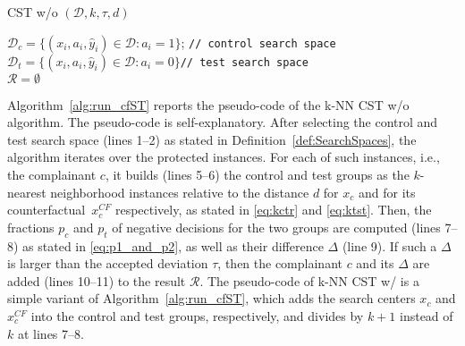 %
\begin{algorithm2e}[t]
\small %
    \caption{CST w/o $(\mathcal{D}, k, \tau, d)$}
    \label{alg:run_cfST}
	\BlankLine
	$\mathcal{D}_c=\{(x_i, a_i, \widehat{y}_i) \in \mathcal{D}: a_i=1\}$; \hfill\texttt{\scriptsize// control search space}\\
    $\mathcal{D}_t=\{(x_i, a_i, \widehat{y}_i) \in \mathcal{D}: a_i=0\}$\hfill\texttt{\scriptsize// test search space}\\
    $\mathcal{R} = \emptyset$\\
\end{algorithm2e}
%

Algorithm~\ref{alg:run_cfST} reports the pseudo-code of the k-NN CST w/o algorithm. The pseudo-code is self-explanatory. 
After selecting the control and test search space (lines 1--2) as stated in Definition~\ref{def:SearchSpaces}, the algorithm iterates over the protected instances. For each of such instances, i.e., the complainant $c$, it builds (lines 5--6) the control and test groups as the $k$-nearest neighborhood instances relative to the distance $d$ for $x_c$ and for its counterfactual~$x^{CF}_c$ respectively, as stated in \eqref{eq:kctr} and \eqref{eq:ktst}. Then, the fractions $p_c$ and $p_t$ of negative decisions for the two groups are computed (lines 7--8) as stated in \eqref{eq:p1_and_p2}, as well as their difference $\Delta$ (line 9). If such a $\Delta$ is larger than the accepted deviation $\tau$, then the complainant $c$ and its $\Delta$ are added (lines 10--11) to the result $\mathcal{R}$.
%
The pseudo-code of k-NN CST w/ is a simple variant of Algorithm~\ref{alg:run_cfST}, which adds the search centers $x_c$ and $x^{CF}_c$ into the control and test groups, respectively, and divides by $k+1$ instead of $k$ at lines 7--8.

